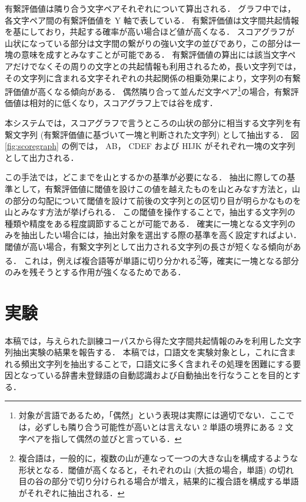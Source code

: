 \vspace{-4mm}

有繋評価値は隣り合う文字ペアそれぞれについて算出される．
グラフ中では，各文字ペア間の有繋評価値を Y 軸で表している．
有繋評価値は文字間共起情報を基にしており，共起する確率が高い場合ほど値が高くなる．
スコアグラフが山状になっている部分は文字間の繋がりの強い文字の並びであり，この部分は一塊の意味を成すとみなすことが可能である．
有繋評価値の算出には該当文字ペアだけでなくその周りの文字との共起情報も利用されるため，長い文字列では，その文字列に含まれる文字それぞれの共起関係の相乗効果により，文字列の有繋評価値が高くなる傾向がある．
偶然隣り合って並んだ文字ペア\footnote{対象が言語であるため，「偶然」という表現は実際には適切でない．ここでは，必ずしも隣り合う可能性が高いとは言えない 2 単語の境界にある 2 文字ペアを指して偶然の並びと言っている．}の場合，有繋評価値は相対的に低くなり，スコアグラフ上では谷を成す．

本システムでは，スコアグラフで言うところの山状の部分に相当する文字列を有繋文字列 (有繋評価値に基づいて一塊と判断された文字列\cite{nobesawa96coling}) として抽出する．
図 \ref{fig:scoregraph} の例では， {\gt AB}， {\gt CDEF} および {\gt HIJK} がそれぞれ一塊の文字列として出力される．

この手法では，どこまでを山とするかの基準が必要になる．
抽出に際しての基準として，有繋評価値に閾値を設けこの値を越えたものを山とみなす方法と，山の部分の勾配について閾値を設けて前後の文字列との区切り目が明らかなものを山とみなす方法が挙げられる．
この閾値を操作することで，抽出する文字列の種類や精度をある程度調節することが可能である．
確実に一塊となる文字列のみを抽出したい場合には，抽出対象を選出する際の基準を高く設定すればよい．
閾値が高い場合，有繋文字列として出力される文字列の長さが短くなる傾向がある．
これは，例えば複合語等が単語に切り分かれる\footnote{複合語は，一般的に，複数の山が連なって一つの大きな山を構成するような形状となる．閾値が高くなると，それぞれの山 (大抵の場合，単語) の切れ目の谷の部分で切り分けられる場合が増え，結果的に複合語を構成する単語がそれぞれに抽出される．}等，確実に一塊となる部分のみを残そうとする作用が強くなるためである．
\section{実験}
本稿では，与えられた訓練コーパスから得た文字間共起情報のみを利用した文字列抽出実験の結果を報告する．
本稿では，口語文を実験対象とし，これに含まれる頻出文字列を抽出することで，口語文に多く含まれその処理を困難にする要因となっている辞書未登録語の自動認識および自動抽出を行なうことを目的とする．

